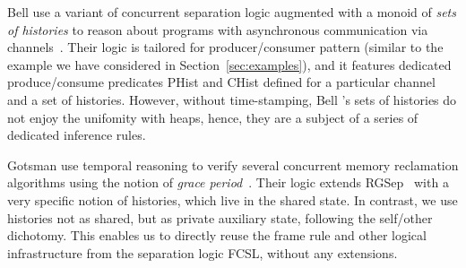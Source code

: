 Bell \etal use a variant of concurrent separation logic augmented with
a monoid of \emph{sets of histories} to reason about programs with
asynchronous communication via channels~\cite{Bell-al:SAS10}. Their
logic is tailored for producer/consumer pattern (similar to the
example we have considered in Section~\ref{sec:examples}), and it
features dedicated produce/consume predicates PHist and CHist defined
for a particular channel and a set of histories. However, without
time-stamping, Bell \etal's sets of histories do not enjoy the
unifomity with heaps, hence, they are a subject of a series of
dedicated inference rules.

Gotsman \etal use temporal reasoning to verify several concurrent
memory reclamation algorithms using the notion of \emph{grace
  period}~\cite{Gotsman-al:ESOP13}. Their logic extends
RGSep~\cite{Vafeiadis-Parkinson:CONCUR07} with a very specific notion
of histories, which live in the shared state. In contrast, we use
histories not as shared, but as private auxiliary state, following the
self/other dichotomy. This enables us to directly reuse the frame
rule and other logical infrastructure from the separation logic FCSL,
without any extensions.


